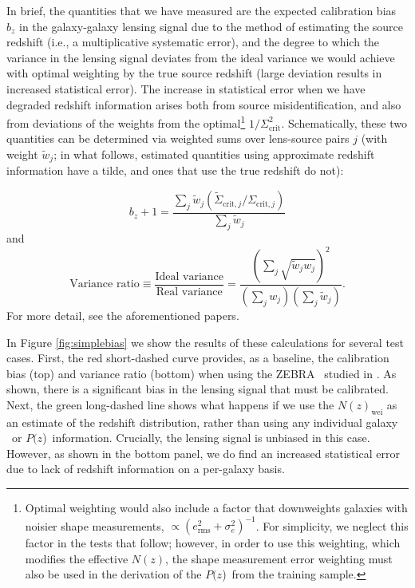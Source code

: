 \documentclass[preprint]{aastex}
\newcommand{\pofz}{$P(z$)}
\begin{document}
In brief, the quantities that we have measured are the expected calibration
bias $b_z$ in the galaxy-galaxy lensing signal due to the method of estimating
the source redshift (i.e., a multiplicative systematic error), and the degree to
which the variance in the lensing signal deviates from the ideal variance we
would achieve with optimal weighting by the true source redshift (large
deviation results in increased statistical error).  The increase in statistical
error when we have degraded redshift information arises both from source
misidentification, and also from deviations of the weights from the
optimal\footnote{Optimal weighting would also include a factor that downweights
galaxies with noisier shape measurements, $\propto (e_\mathrm{rms}^2 +
\sigma_e^2)^{-1}$.  For simplicity, we neglect this factor in the tests that
follow; however, in order to use this weighting, which modifies the effective
$N(z)$, the shape measurement error weighting must also be used in the
derivation of the \pofz\ from the training sample.} $1/\Sigma_\mathrm{crit}^2$.
Schematically, these two quantities can be determined via weighted sums over
lens-source pairs $j$ (with weight $\tilde{w}_j$; in what follows, estimated
quantities using approximate redshift information have a tilde, and ones that
use the true redshift do not):

\noindent
\begin{equation} \label{eq:lensbias}
b_z + 1 = \frac{\sum_j \tilde{w}_j (\tilde{\Sigma}_{\mathrm{crit},j}
   / \Sigma_{\mathrm{crit},j})}{\sum_j \tilde{w}_j}
\end{equation}
and
\begin{equation} \label{eq:lensweight}
\textrm{Variance ratio}  \equiv \frac{\textrm{Ideal variance}}{\textrm{Real
     variance}} = \frac{(\sum_j \sqrt{\tilde{w}_j w_j})^2}{(\sum_j
     w_j)(\sum_j \tilde{w}_j)}.
\end{equation}
For more detail, see the aforementioned papers.

In Figure \ref{fig:simplebias} we show the results of these calculations for
several test cases.  First, the red short-dashed curve provides, as a baseline,
the calibration bias (top) and variance ratio (bottom) when using the ZEBRA
\photoz\ studied in \citet{Nakajima11}.  As shown, there is a
significant bias in the lensing signal that must be calibrated.
Next, the green long-dashed line shows what happens if we use the
$N(z)_\mathrm{wei}$ as an estimate of the redshift distribution, rather than
using any individual galaxy \photoz\ or \pofz\ information.  Crucially, the
lensing signal is unbiased in this case. However, as shown in the bottom
panel, we do find an increased
statistical error due to lack of redshift information on a per-galaxy basis.
\end{document}
